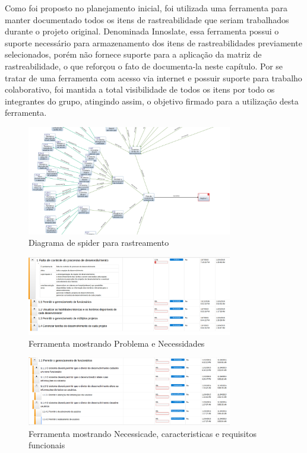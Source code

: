 Como foi proposto no planejamento inicial, foi utilizada uma ferramenta para manter documentado todos os itens de rastreabilidade que seriam trabalhados durante o projeto original. Denominada Innoslate, essa ferramenta possui o suporte necessário para armazenamento dos itens de rastreabilidades previamente selecionados, porém não fornece suporte para a aplicação da matriz de rastreabilidade, o que reforçou o fato de documenta-la neste capítulo. Por se tratar de uma ferramenta com acesso via internet e possuir suporte para trabalho colaborativo, foi mantida a total visibilidade de todos os itens por todo os integrantes do grupo, atingindo assim, o objetivo firmado para a utilização desta ferramenta.

\begin{figure}[H]
  \center
  \includegraphics[width=0.8\textwidth]{figuras/spider.png}
  \caption{Diagrama de spider para rastreamento}
  \label{fig:diagrama-caso-uso}
\end{figure}

\begin{figure}[H]
  \center
  \includegraphics[width=0.8\textwidth]{figuras/necessidades.png}
  \caption{Ferramenta mostrando Problema e Necessidades}
  \label{fig:diagrama-caso-uso}
\end{figure}

\begin{figure}[H]
  \center
  \includegraphics[width=0.8\textwidth]{figuras/carac-req-fun.png}
  \caption{Ferramenta mostrando Necessicade, caracteristicas e requisitos funcionais}
  \label{fig:diagrama-caso-uso}
\end{figure}

